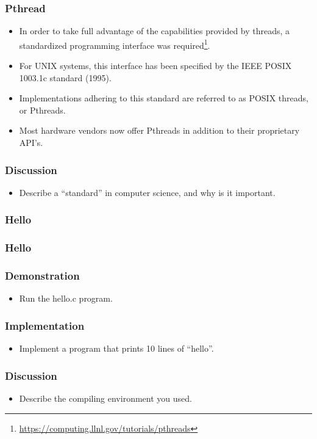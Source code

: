 \documentclass{beamer}
\begin{document}
\begin{frame}
\frametitle{Pthread}
\begin{itemize}
\item In order to take full advantage of the capabilities provided by
  threads, a standardized programming interface was
  required\footnote{\url{https://computing.llnl.gov/tutorials/pthreads}}.
\item For UNIX systems, this interface has been specified by the IEEE
  POSIX 1003.1c standard (1995).
\item Implementations adhering to this standard are referred to as
  POSIX threads, or Pthreads.
\item Most hardware vendors now offer Pthreads in addition to their
  proprietary API's.
\end{itemize}
\end{frame}

\begin{frame}
\frametitle{Discussion}
\begin{itemize}
\item Describe a ``standard'' in computer science, and why is it
  important.
\end{itemize}
\end{frame}

\begin{frame}
\frametitle{Hello}
\end{frame}

\begin{frame}
\frametitle{Hello}
\end{frame}

\begin{frame}
\frametitle{Demonstration}
\begin{itemize}
\item Run the hello.c program.
\end{itemize}
\end{frame}

\begin{frame}
\frametitle{Implementation}
\begin{itemize}
\item Implement a program that prints 10 lines of ``hello''.
\end{itemize}
\end{frame}

\begin{frame}
\frametitle{Discussion}
\begin{itemize}
\item Describe the compiling environment you used.
\end{itemize}
\end{frame}
\end{document}
